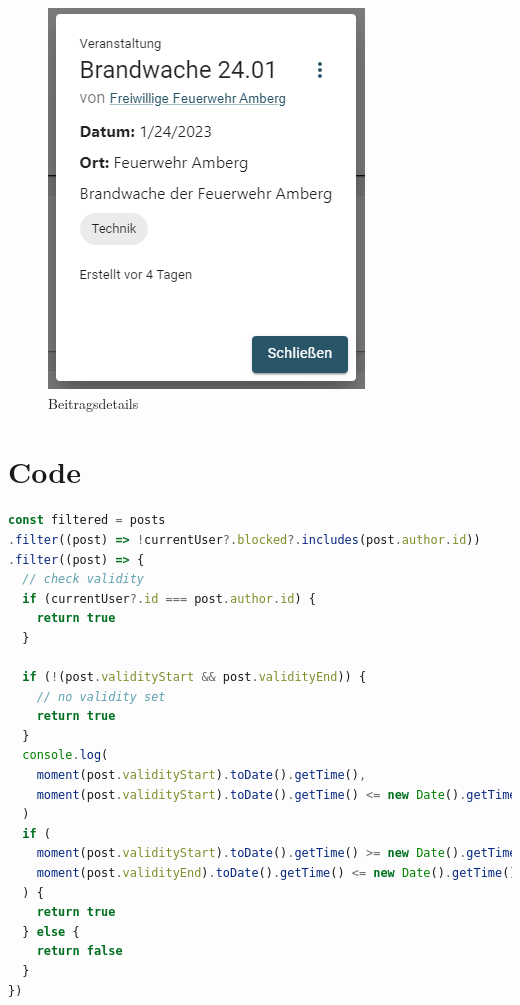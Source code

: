 \begin{figure}[ht!]
  \begin{centering}
    \includegraphics[width=.75\textwidth]{figures/implementation/details.png}
    \caption{Beitragsdetails}
    \label{fig:details}
  \end{centering}
\end{figure}

\clearpage
\section{Code}
\label{annex:code}

\begin{lstlisting}[language=JavaScript, label=code:filterPosts, title={Filterfunktion der Beiträge}]
const filtered = posts
.filter((post) => !currentUser?.blocked?.includes(post.author.id))
.filter((post) => {
  // check validity
  if (currentUser?.id === post.author.id) {
    return true
  }

  if (!(post.validityStart && post.validityEnd)) {
    // no validity set
    return true
  }
  console.log(
    moment(post.validityStart).toDate().getTime(),
    moment(post.validityStart).toDate().getTime() <= new Date().getTime(),
  )
  if (
    moment(post.validityStart).toDate().getTime() >= new Date().getTime() &&
    moment(post.validityEnd).toDate().getTime() <= new Date().getTime()
  ) {
    return true
  } else {
    return false
  }
})
\end{lstlisting}
